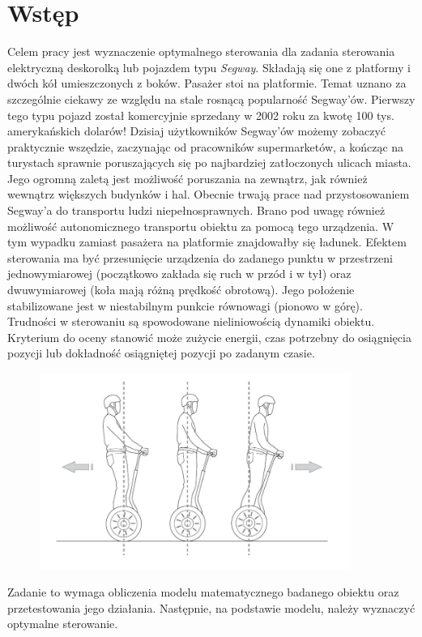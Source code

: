 \section{Wstęp}
\label{sec:wstep}

Celem pracy jest wyznaczenie optymalnego sterowania dla zadania sterowania elektryczną deskorolką lub pojazdem typu \textit{Segway}. Składają się one z platformy i dwóch kół umieszczonych z boków. Pasażer stoi na platformie. Temat uznano za szczególnie ciekawy ze względu na stale rosnącą popularność Segway'ów. Pierwszy tego typu pojazd został komercyjnie sprzedany w 2002 roku za kwotę 100 tys. amerykańskich dolarów! Dzisiaj użytkowników Segway'ów możemy zobaczyć praktycznie wszędzie, zaczynając od pracowników supermarketów, a kończąc na turystach sprawnie poruszających się po najbardziej zatłoczonych ulicach miasta. Jego ogromną zaletą jest możliwość poruszania na zewnątrz, jak również wewnątrz większych budynków i hal. Obecnie trwają prace nad przystosowaniem Segway'a do transportu ludzi niepełnosprawnych. Brano pod uwagę również możliwość autonomicznego transportu obiektu za pomocą tego urządzenia. W tym wypadku zamiast pasażera na platformie znajdowałby się ładunek. Efektem sterowania ma być przesunięcie urządzenia do zadanego punktu w przestrzeni jednowymiarowej (początkowo zakłada się ruch w przód i w tył) oraz dwuwymiarowej (koła mają różną prędkość obrotową). Jego położenie stabilizowane jest w niestabilnym punkcie równowagi (pionowo w górę). Trudności w sterowaniu są spowodowane nieliniowością dynamiki obiektu. Kryterium do oceny stanowić może zużycie energii, czas potrzebny do osiągnięcia pozycji lub dokładność osiągniętej pozycji po zadanym czasie. %

\begin{figure}[h]
	\centering
	\includegraphics[width=4in]{Figures/wstep_segway.jpg}
	\label{fig:wstep_segway}
\end{figure}

Zadanie to wymaga obliczenia modelu matematycznego badanego obiektu oraz przetestowania jego działania. Następnie, na podstawie modelu, należy wyznaczyć optymalne sterowanie.